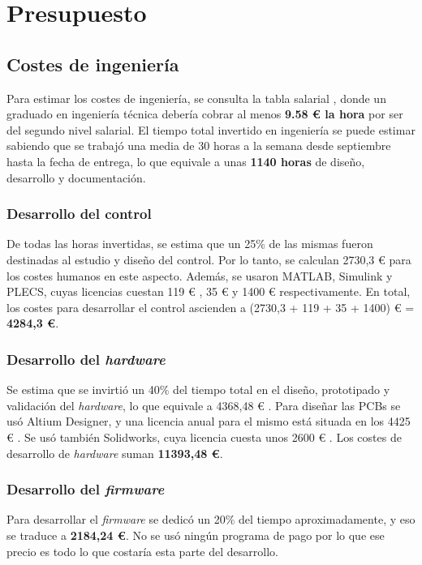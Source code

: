 \newpage
\section*{Presupuesto}
\subsection*{Costes de ingeniería}

Para estimar los costes de ingeniería, se consulta la tabla salarial \cite{SEGSOC2024}, donde un graduado en ingeniería técnica debería cobrar al menos \textbf{9.58 \euro{}  la hora} por ser del segundo nivel salarial. El tiempo total invertido en ingeniería se puede estimar sabiendo que se trabajó una media de 30 horas a la semana desde septiembre hasta la fecha de entrega, lo que equivale a unas \textbf{1140 horas} de diseño, desarrollo y documentación.

\subsubsection*{Desarrollo del control}
De todas las horas invertidas, se estima que un 25\% de las mismas fueron destinadas al estudio y diseño del control. Por lo tanto, se calculan 2730,3 \euro{} para los costes humanos en este aspecto. Además, se usaron MATLAB, Simulink y PLECS, cuyas licencias cuestan 119 \euro{} \cite{MathWorks2024}, 35 \euro{} \cite{MathWorks2024} y 1400 \euro{} \cite{Plexim2024} respectivamente. En total, los costes para desarrollar el control ascienden a (2730,3 + 119 + 35 + 1400) \euro{}  = \textbf{4284,3 \euro{}}.

\subsubsection*{Desarrollo del \textit{hardware}}
Se estima que se invirtió un 40\% del tiempo total en el diseño, prototipado y validación del \textit{hardware}, lo que equivale a 4368,48 \euro{} . Para diseñar las PCBs se usó Altium Designer, y una licencia anual para el mismo está situada en los 4425 \euro{} \cite{Altium2024}. Se usó también Solidworks, cuya licencia cuesta unos 2600 \euro{} \cite{GoEngineer2024}. Los costes de desarrollo de \textit{hardware} suman \textbf{11393,48 \euro{}}.

\subsubsection*{Desarrollo del \textit{firmware}}
Para desarrollar el \textit{firmware} se dedicó un 20\% del tiempo aproximadamente, y eso se traduce a \textbf{2184,24 \euro{}}. No se usó ningún programa de pago por lo que ese precio es todo lo que costaría esta parte del desarrollo.

